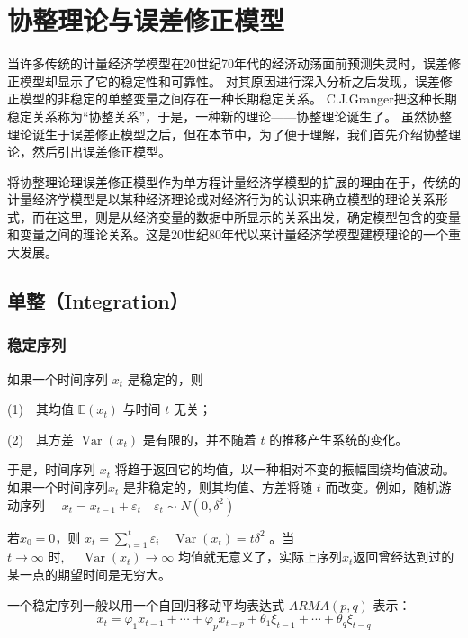 \chapter{协整理论与误差修正模型}

	当许多传统的计量经济学模型在20世纪70年代的经济动荡面前预测失灵时，误差修正模型却显示了它的稳定性和可靠性。
	对其原因进行深入分析之后发现，误差修正模型的非稳定的单整变量之间存在一种长期稳定关系。
	C.J.Granger把这种长期稳定关系称为“协整关系”，于是，一种新的理论——协整理论诞生了。
	虽然协整理论诞生于误差修正模型之后，但在本节中，为了便于理解，我们首先介绍协整理论，然后引出误差修正模型。
	
	将协整理论理误差修正模型作为单方程计量经济学模型的扩展的理由在于，传统的计量经济学模型是以某种经济理论或对经济行为的认识来确立模型的理论关系形式，而在这里，则是从经济变量的数据中所显示的关系出发，确定模型包含的变量和变量之间的理论关系。这是20世纪80年代以来计量经济学模型建模理论的一个重大发展。

\section{单整（Integration）}
	\subsection{稳定序列}
		如果一个时间序列 $ x_{t} $ 是稳定的，则
		
		(1)\ \ 其均值 $ \mathbb{E}(x_{t}) $ 与时间 $ t $ 无关；
		
		(2)\ \ 其方差 $ \operatorname{Var}\left(x_{t}\right) $ 是有限的，并不随着 $ t $ 的推移产生系统的变化。
		
		于是，时间序列 $ x_{t} $ 将趋于返回它的均值，以一种相对不变的振幅围绕均值波动。
		如果一个时间序列$ x_{t} $ 是非稳定的，则其均值、方差将随 $ t $ 而改变。例如，随机游动序列 \ \ 
		$ x_{t}=x_{t-1}+\varepsilon_{t} \quad \varepsilon_{t} \sim N\left(0, \delta^{2}\right) $
		
		若$ x_{0}  = 0 $，则 $ x_{t}=\sum_{i=1}^{t} \varepsilon_{i} \quad \operatorname{Var}\left(x_{t}\right)=t \delta^{2} $ 。当
	$	t \rightarrow \infty \text { 时, } \quad \operatorname{Var}\left(x_{t}\right) \rightarrow \infty $ 
		均值就无意义了，实际上序列$ x_{t} $返回曾经达到过的某一点的期望时间是无穷大。
		
		一个稳定序列一般以用一个自回归移动平均表达式 $ ARMA (p,q) $ 表示：
		\vspace{-0.5em}
		$$ x_{t}=\varphi_{1} x_{t-1}+\cdots+\varphi_{p} x_{t-p}+\theta_{1}\xi_{t-1}+\cdots+\theta_{q} \xi_{t-q} $$

